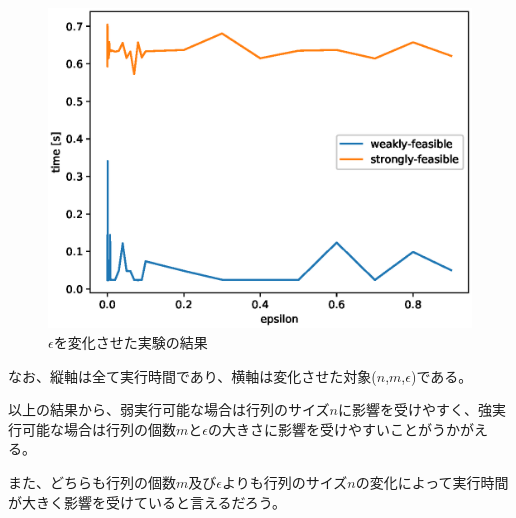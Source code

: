 \begin{figure}
  \centering
  \includegraphics{epsilon-times.eps}
  \caption{$\epsilon$を変化させた実験の結果}
  \label{test4-epsilon}
\end{figure}
なお、縦軸は全て実行時間であり、横軸は変化させた対象($n$,$m$,$\epsilon$)である。

以上の結果から、弱実行可能な場合は行列のサイズ$n$に影響を受けやすく、強実行可能な場合は行列の個数$m$と$\epsilon$の大きさに影響を受けやすいことがうかがえる。

また、どちらも行列の個数$m$及び$\epsilon$よりも行列のサイズ$n$の変化によって実行時間が大きく影響を受けていると言えるだろう。

